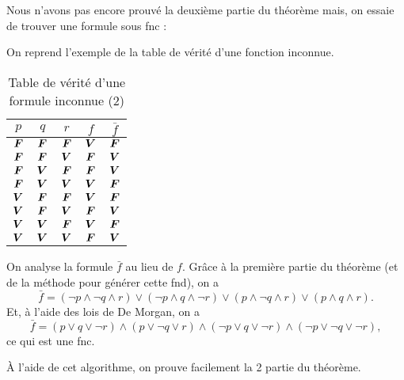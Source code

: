 Nous n'avons pas encore prouvé la deuxième partie du théorème mais, on essaie de trouver une formule sous {\sc fnc}\/ :
\begin{exm}
	On reprend l'exemple de la table de vérité d'une fonction inconnue.

	\begin{table}[H]
		\centering
		\begin{tabular}{c|c|c|c|c}
			$p$&$q$&$r$&$f$&$\bar f$\\[2mm]\hline
			$\bm{F}$&$\bm{F}$&$\bm{F}$&$\bm{V}$&$\bm{F}$\\
			$\bm{F}$&$\bm{F}$&$\bm{V}$&$\bm{F}$&$\bm{V}$\\
			$\bm{F}$&$\bm{V}$&$\bm{F}$&$\bm{F}$&$\bm{V}$\\
			$\bm{F}$&$\bm{V}$&$\bm{V}$&$\bm{V}$&$\bm{F}$\\
			$\bm{V}$&$\bm{F}$&$\bm{F}$&$\bm{V}$&$\bm{F}$\\
			$\bm{V}$&$\bm{F}$&$\bm{V}$&$\bm{F}$&$\bm{V}$\\
			$\bm{V}$&$\bm{V}$&$\bm{F}$&$\bm{V}$&$\bm{F}$\\
			$\bm{V}$&$\bm{V}$&$\bm{V}$&$\bm{F}$&$\bm{V}$
		\end{tabular}
		\caption{Table de vérité d'une formule inconnue (2)}
	\end{table}

	On analyse la formule $\bar{f}$\/ au lieu de $f$. Grâce à la première partie du théorème (et de la méthode pour générer cette {\sc fnd}), on a \[
		\bar{f}= (\lnot p \land \lnot q \land r)
		\lor
		(\lnot p \land q \land \lnot r)
		\lor
		(p \land \lnot q \land r)
		\lor
		(p \land q \land r)
	.\]
	Et, à l'aide des lois de {\sc De Morgan}, on a \[
		\bar{f}= (p \lor q \lor\lnot r)
		\land
		( p \lor\lnot q \lor r)
		\land
		(\lnot p \lor q \lor \lnot r)
		\land
		(\lnot p \lor \lnot q \lor \lnot r),
	\] ce qui est une {\sc fnc}.

	À l'aide de cet algorithme, on prouve facilement la 2 partie du théorème.
\end{exm}

